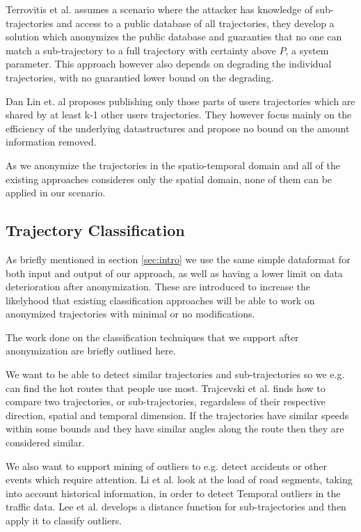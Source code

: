 Terrovitis et al.\cite{privPrevTrajec} assumes a scenario where the attacker has knowledge of sub-trajectories and access to a public database of all trajectories, they develop a solution which anonymizes the public database and guaranties that no one can match a sub-trajectory to a full trajectory with certainty above $P$, a system parameter. This approach however also depends on degrading the individual trajectories, with no guarantied lower bound on the degrading.

Dan Lin et. al \cite{dlin} proposes publishing only those parts of users trajectories which are shared by at least k-1 other users trajectories. They however focus mainly on the efficiency of the underlying datastructures and propose no bound on the amount information removed.

As we anonymize the trajectories in the spatio-temporal domain and all of the existing approaches consideres only the spatial domain, none of them can be applied in our scenario.


\subsection{Trajectory Classification}

As briefly mentioned in section \ref{sec:intro} we use the same simple dataformat for both input and output of our approach, as well as having a lower limit on data deterioration after anonymization. These are introduced to increase the likelyhood that existing classification approaches will be able to work on anonymized trajectories with minimal or no modifications.

The work done on the classification techniques that we support after anonymization are briefly outlined here.

We want to be able to detect similar trajectories and sub-trajectories \cite{dymaware07, Li2007, napa08} so we e.g. can find the hot routes\cite{Li2007} that people use most. Trajcevski et al.\cite{dymaware07} finds how to compare two trajectories, or sub-trajectories, regardsless of their respective direction, spatial and temporal dimension. If the trajectories have similar speeds within some bounds and they have similar angles along the route then they are considered similar. 

We also want to support mining of outliers \cite{outlier09, outlier08} to e.g. detect accidents or other events which require attention. Li et al. look at the load of road segments, taking into account historical information, in order to detect Temporal outliers in the traffic data. Lee et al. \cite{outlier08} develops a distance function for sub-trajectories and then apply it to classify outliers.